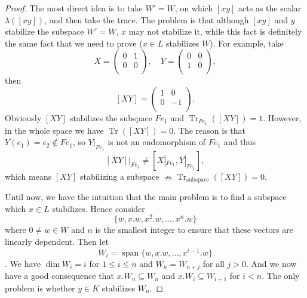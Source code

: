 \begin{proof}
    The most direct idea is to take $W'=W$, on which $[xy]$ acts as the scalar $\lambda([xy])$, and then take the trace. The problem is that although $[xy]$ and $y$ stabilize the subspace $W'=W$, $x$ may not stabilize it, while this fact is definitely the same fact that we need to prove ($x \in L$ stabilizes $W$). For example, take 
    \begin{equation*}
        X=\begin{pmatrix}
            0 & 1 \\
            0 & 0 \\
        \end{pmatrix},       \quad      Y=\begin{pmatrix}
            0 & 0 \\
            1 & 0 \\
        \end{pmatrix},
    \end{equation*}
    then $$[XY]=\begin{pmatrix}
        1 & 0 \\
        0 & -1 \\
    \end{pmatrix}.$$ Obviously $[XY]$ stabilizes the subspace $Fe_{1}$ and $\operatorname{Tr}_{Fe_{1}}([XY])=1$. However, in the whole space we have $\operatorname{Tr}([XY])=0$. The reason is that $Y(e_{1})=e_{2}\notin Fe_{1}$, so $Y|_{Fe_{1}}$ is not an endomorphism of $Fe_{1}$ and thus $$[XY]|_{Fe_{1}}\neq [X|_{Fe_{1}},Y|_{Fe_{1}}],$$ which means $[XY]$ stabilizing a subspace $\nRightarrow \operatorname{Tr}_{\text{subspace}}([XY])=0$. 

    Until now, we have the intuition that the main problem is to find a subspace which $x\in L$ stabilizes. Hence consider $$\{w,x.w,x^2.w, \ldots,x^n.w\}$$ where $0\neq w \in W$ and $n$ is the smallest integer to ensure that these vectors are linearly dependent. Then let $$W_{i}=\operatorname{span} \{w,x.w, \ldots,x^{i-1}.w\}$$. We have $\operatorname{dim}W_{i}=i$ for $1\leq i\leq n$ and $W_{n}=W_{n+j}$ for all $j>0$. And we now have a good consequence that $x.W_{n}\subseteq W_{n}$ and $x.W_{i} \subseteq W_{i+1}$ for $i<n$. The only problem is whether $y\in K$ stabilizes $W_{n}$.
    

\end{proof}
